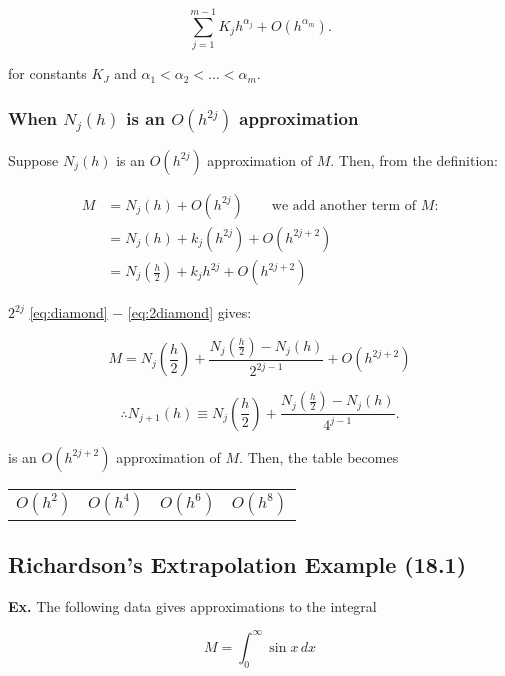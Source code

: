 \documentclass[12pt]{article}
\newcommand{\Ex}{\textbf{Ex.}\xspace}
\begin{document}
\[
  \sum_{j=1}^{m-1} K_j h^{\alpha_j} + O(h^{\alpha_m})
.\]

\noindent
for constants $K_J$ and $\alpha_1 < \alpha_2 < \dots < \alpha_m$.

\subsubsection{When $N_j(h)$ is an $O(h^{2j})$ approximation}\label{sec:richardson_extrapolation_when_n_j_is_o_h_2j}
Suppose $N_j(h)$ is an $O(h^{2j})$ approximation of $M$. Then, from the
definition:

\begin{align}
  M &= N_j(h) + O(h^{2j}) \qquad \text{we add another term of } M \text{:} \\
    &= N_j(h) + k_j(h^{2j}) + O(h^{2j+2}) \label{eq:diamond} \\
    &= N_j(\frac{h}{2}) + k_jh^{2j} + O(h^{2j+2}) \label{eq:2diamond}
\end{align}

$2^{2j}$ \eqref{eq:diamond} $-$ \eqref{eq:2diamond} gives:

\begin{equation*}
  M = N_j(\frac{h}{2}) + \frac{N_j(\frac{h}{2})-N_j(h)}{2^{2j-1}} + O(h^{2j+2})
\end{equation*}

\[
  \boxed{\therefore 
    N_{j+1}(h) \equiv N_j\left(\frac{h}{2}\right) 
    + \frac{N_j\left(\frac{h}{2}\right)-N_j(h)}{4^{j-1}}
  }
.\]

\noindent
is an $O(h^{2j+2})$ approximation of $M$. Then, the table becomes

\begin{center}
  \centering
  \begin{tabular}{cccc}
    $O(h^2)$ & $O(h^4)$ & $O(h^6)$ & $O(h^8)$
  \end{tabular}
\end{center}

\subsection{Richardson's Extrapolation Example (18.1)}\label{sec:richardson_extrapolation_example}

\Ex The following data gives approximations to the integral 

\begin{equation}
  M = \int_0^\infty \sin x \, dx
\end{equation}
\end{document}
